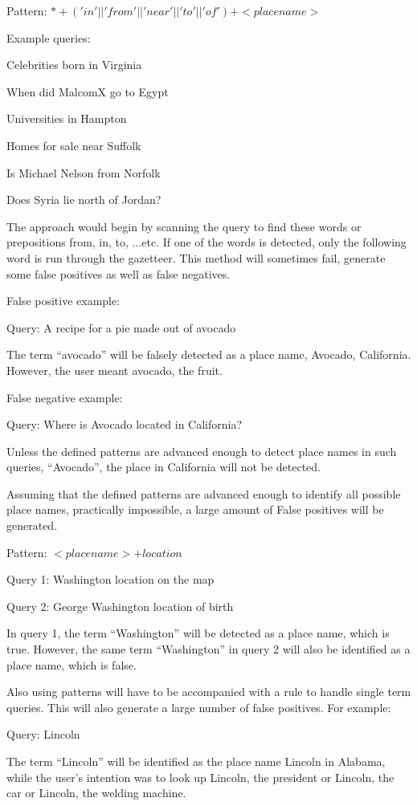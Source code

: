 \documentclass[a4paper, 11pt]{article}
\begin{document}
Pattern: $* + ('in' || 'from' || 'near' || 'to' || 'of' ) + <place name>$

Example queries:

Celebrities born in Virginia

When did MalcomX go to Egypt

Universities in Hampton

Homes for sale near Suffolk  

Is Michael Nelson from Norfolk

Does Syria lie north of Jordan?

The approach would begin by scanning the query to find these words or prepositions from, in, to, ...etc. If one of the words is detected, only the following word is run through the gazetteer. This method will sometimes fail, generate some false positives as well as false negatives. 

False positive example:

Query: A recipe for a pie made out of avocado

The term ``avocado'' will be falsely detected as a place name, Avocado, California. However, the user meant avocado, the fruit.

False negative example:

Query: Where is Avocado located in California?

Unless the defined patterns are advanced enough to detect place names in such queries, ``Avocado'', the place in California will not be detected.

Assuming that the defined patterns are advanced enough to identify all possible place names, practically impossible, a large amount of False positives will be generated.

Pattern: $<place name> + location$

Query 1: Washington location on the map

Query 2: George Washington location of birth

In query 1, the term ``Washington'' will be detected as a place name, which is true. However, the same term ``Washington'' in query 2 will also be identified as a place name, which is false.

Also using patterns will have to be accompanied with a rule to handle single term queries. This will also generate a large number of false positives. For example:

Query: Lincoln

The term ``Lincoln'' will be identified as the place name Lincoln in Alabama, while the user's intention was to look up Lincoln, the president or Lincoln, the car or Lincoln, the welding machine.
\end{document}
